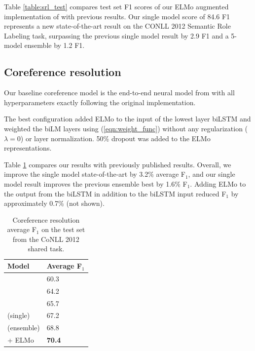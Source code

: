 \documentclass[11pt,a4paper]{article}
\newcommand{\ELMO}{ELMo}
\begin{document}
Table \ref{table:srl_test} compares test set F1 scores of our \ELMO{} augmented implementation of \citep{He2017DeepSR} with previous results. Our single model score of 84.6 F1 represents a new state-of-the-art result on the CONLL 2012 Semantic Role Labeling task, surpassing the previous single model result by 2.9 F1 and a 5-model ensemble by 1.2 F1.



\subsection{Coreference resolution}
Our baseline coreference model is the end-to-end neural model from \citet{Lee2017EndtoendNC} with all hyperparameters exactly following the original implementation.

The best configuration added \ELMO{} to the input of the lowest layer biLSTM and weighted the biLM layers using (\ref{eqn:weight_func}) without any regularization ($\lambda=0$) or layer normalization.
50\% dropout was added to the \ELMO{} representations.

Table \ref{table:coref} compares our results with previously published results.  Overall, we improve the single model state-of-the-art by 3.2\% average F$_1$, and our single model result improves the previous ensemble best by 1.6\% F$_1$.  Adding \ELMO{} to the output from the biLSTM in addition to the biLSTM input reduced F$_1$ by approximately 0.7\% (not shown).



\begin{table}
\centering
\begin{tabular}{l|l}
\textbf{Model}                                & \textbf{Average F$_1$} \\ \hline \hline
\citet{Durrett2013EasyVA}   & 60.3 \\
\citet{Wiseman2016LearningGF}                & 64.2     \\
\citet{Clark2016DeepRL}                  & 65.7      \\
\citet{Lee2017EndtoendNC} (single) & 67.2         \\
\citet{Lee2017EndtoendNC} (ensemble) & 68.8         \\
\citet{Lee2017EndtoendNC} + \ELMO             & \textbf{70.4}       \\
\end{tabular}
\caption{Coreference resolution average F$_1$ on the test set from the CoNLL 2012 shared task.
}
\label{table:coref}
\end{table}
\end{document}
